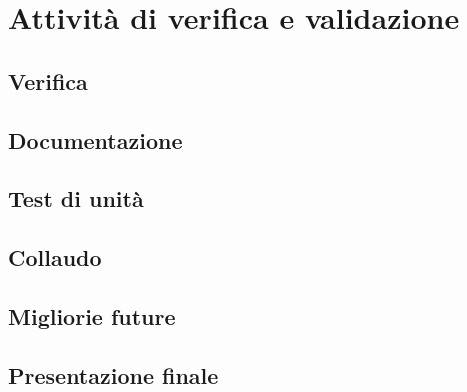 \chapter{Attività di verifica e validazione}
\label{cap:verifica-validazione}


\section{Verifica}
\section{Documentazione}
\section{Test di unità}
\section{Collaudo}
\section{Migliorie future}
\section{Presentazione finale}








